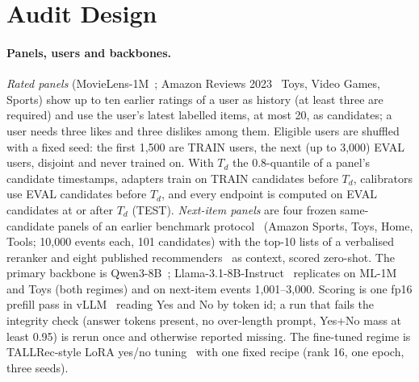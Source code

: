 \section{Audit Design}
\label{sec:design}

\paragraph{Panels, users and backbones.}
\emph{Rated panels} (MovieLens-1M~\citep{harper2015movielens}; Amazon Reviews 2023~\citep{hou2024bridging} Toys, Video Games, Sports) show
up to ten earlier ratings of a user as history (at least three are required) and use the user's latest labelled items, at most 20, as
candidates; a user needs three likes and three dislikes among them. Eligible users are shuffled with a fixed seed: the first 1,500 are TRAIN users, the next (up to 3,000) EVAL
users, disjoint and never trained on. With $T_d$ the 0.8-quantile of a panel's candidate timestamps, adapters train on TRAIN
candidates before $T_d$, calibrators use EVAL candidates before $T_d$, and every endpoint is computed on EVAL candidates at or after
$T_d$ (TEST). \emph{Next-item panels} are four frozen same-candidate panels of an earlier benchmark protocol~\citep{anon2026benchmark}
(Amazon Sports, Toys, Home, Tools; 10,000 events each, 101 candidates) with the top-10 lists of a verbalised reranker and eight
published recommenders~\citep{wang2024elmrec,wang2025irllrec,he2025llm2rec,liu2025llmemb,liu2024llmesr,zhang2026proex,zhang2026promax,ren2024rlmrec}
as context, scored zero-shot. The primary backbone is Qwen3-8B~\citep{yang2025qwen3}; Llama-3.1-8B-Instruct~\citep{grattafiori2024llama3}
replicates on ML-1M and Toys (both regimes) and on next-item events 1,001--3,000. Scoring is one fp16 prefill pass in
vLLM~\citep{kwon2023vllm} reading Yes and No by token id; a run that fails the integrity check (answer tokens present, no over-length
prompt, Yes+No mass at least 0.95) is rerun once and otherwise reported missing. The fine-tuned regime is TALLRec-style LoRA
yes/no tuning~\citep{bao2023tallrec,hu2022lora} with one fixed recipe (rank 16, one epoch, three seeds).

